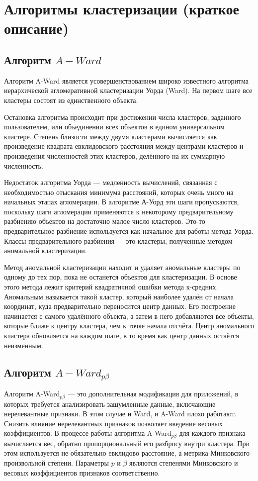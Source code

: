 \documentclass[12pt,tikz]{instruction}
\begin{document}
\section{Алгоритмы кластеризации (краткое описание)}
\label{sec:algs}
\subsection{Алгоритм $ A-Ward $}
\label{subsec:a-ward}
Алгоритм A-Ward является усовершенствованием  широко известного алгоритма иерархической агломеративной кластеризации Уорда (Ward)\cite{ward}. На первом шаге все кластеры состоят из единственного объекта. 

Остановка алгоритма происходит при достижении числа кластеров, заданного пользователем, или объединении всех объектов в едином универсальном кластере. Степень близости между двумя кластерами вычисляется как произведение квадрата евклидовского расстояния между центрами кластеров и произведения численностей этих кластеров, делённого на их суммарную численность. 

Недостаток алгоритма Уорда --- медленность вычислений, связанная с необходимостью отыскания минимума расстояний, которых очень много на начальных этапах агломерации. В алгоритме А-Уорд эти шаги пропускаются, поскольку шаги агломерации применяются к некоторому предварительному разбиению объектов на достаточно малое число кластеров. Это-то предварительное разбиение используется как начальное для работы метода Уорда. Классы предварительного разбиения --- это кластеры, полученные методом аномальной кластеризации.

Метод аномальной кластеризации находит и удаляет аномальные кластеры по одному до тех пор, пока не останется объектов для кластеризации. В основе этого метода лежит критерий квадратичной ошибки метода к-средних. Аномальным называется такой кластер, который наиболее удалён от начала координат, куда предварительно переносится центр данных. Его построение начинается с самого удалённого объекта, а затем в него добавляются все объекты, которые ближе к центру кластера, чем к точке начала отсчёта. Центр аномального кластера обновляется на каждом шаге, в то время как центр данных остаётся неизменным.


\subsection{Алгоритм $ A-Ward_{p\beta} $}
Алгоритм A-Ward$_{p\beta}$ --- это дополнительная модификация для приложений, в которых требуется анализировать зашумленные данные, включающие нерелевантные признаки. В этом случае и Ward, и A-Ward плохо работают. Снизить влияние нерелевантных признаков позволяет введение весовых коэффициентов. В процессе работы алгоритма A-Ward$_{p\beta}$ для каждого признака вычисляется вес, обратно пропорциональный его разбросу  внутри кластера. При этом используется не обязательно евклидово расстояние, а метрика Минковского произвольной степени. Параметры $ p $ и  $ \beta $ являются степенями Минковского и 
весовых коэффициентов признаков соответственно.
\end{document}

